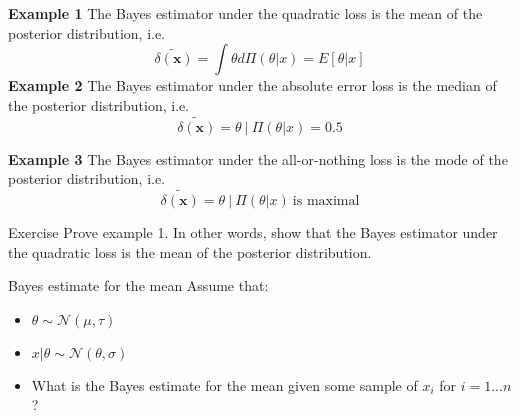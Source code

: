 \documentclass[11pt]{beamer}
\begin{document}
\begin{frame}

\textbf{Example 1} The Bayes estimator under the quadratic loss is the
mean of the posterior distribution, i.e.
$$\widetilde{\delta(\mathbf{x})}= \int \theta d\Pi(\theta|x)=E[\theta|x]$$
\bigskip
\textbf{Example 2} The Bayes estimator under the absolute error  loss is the median of the posterior distribution, i.e.
$$ \widetilde{\delta(\mathbf{x})}=\theta\ | \  \Pi(\theta|x)=0.5$$


\bigskip
\textbf{Example 3} The Bayes estimator under the all-or-nothing loss is the mode of the posterior distribution, i.e.
$$ \widetilde{\delta(\mathbf{x})}=\theta\ | \ \Pi(\theta|x) \ \mbox{is maximal}$$

\end{frame}
\begin{frame}{Exercise}
Prove example 1. In other words, show that  the Bayes estimator under the quadratic loss is the mean of the posterior distribution.\\
\vspace{5cm}

\end{frame}
\begin{frame}

\end{frame}
\begin{frame}{Bayes estimate for the mean}
\vspace{- 3 cm}
Assume that: 
\begin{itemize}
\item $\theta \sim \mathcal{N}{(\mu, \tau)}$

\item  $ x|\theta \sim \mathcal{N}{(\theta, \sigma)}$

\item What is the Bayes estimate for the mean given some sample of $x_i$ for $i=1...n$?
\end{itemize}

\end{frame}
\begin{frame}

\end{frame}
\end{document}
